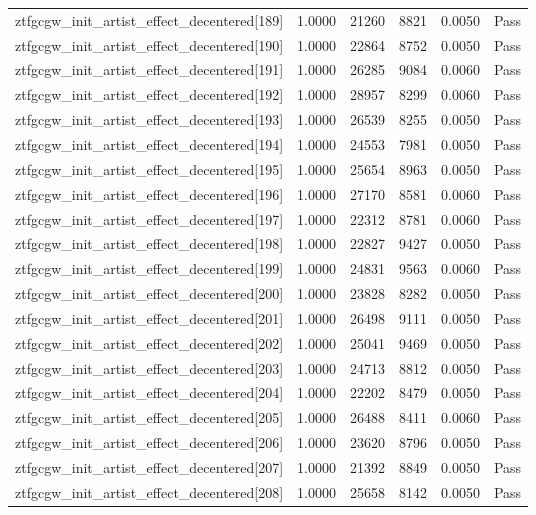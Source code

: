 \begin{table}[htbp]
\begin{tabular}{llrrll}
ztfgcgw\_init\_artist\_effect\_decentered[189] & 1.0000 & 21260 & 8821 & 0.0050 & Pass \\
ztfgcgw\_init\_artist\_effect\_decentered[190] & 1.0000 & 22864 & 8752 & 0.0050 & Pass \\
ztfgcgw\_init\_artist\_effect\_decentered[191] & 1.0000 & 26285 & 9084 & 0.0060 & Pass \\
ztfgcgw\_init\_artist\_effect\_decentered[192] & 1.0000 & 28957 & 8299 & 0.0060 & Pass \\
ztfgcgw\_init\_artist\_effect\_decentered[193] & 1.0000 & 26539 & 8255 & 0.0050 & Pass \\
ztfgcgw\_init\_artist\_effect\_decentered[194] & 1.0000 & 24553 & 7981 & 0.0050 & Pass \\
ztfgcgw\_init\_artist\_effect\_decentered[195] & 1.0000 & 25654 & 8963 & 0.0050 & Pass \\
ztfgcgw\_init\_artist\_effect\_decentered[196] & 1.0000 & 27170 & 8581 & 0.0060 & Pass \\
ztfgcgw\_init\_artist\_effect\_decentered[197] & 1.0000 & 22312 & 8781 & 0.0060 & Pass \\
ztfgcgw\_init\_artist\_effect\_decentered[198] & 1.0000 & 22827 & 9427 & 0.0050 & Pass \\
ztfgcgw\_init\_artist\_effect\_decentered[199] & 1.0000 & 24831 & 9563 & 0.0060 & Pass \\
ztfgcgw\_init\_artist\_effect\_decentered[200] & 1.0000 & 23828 & 8282 & 0.0050 & Pass \\
ztfgcgw\_init\_artist\_effect\_decentered[201] & 1.0000 & 26498 & 9111 & 0.0050 & Pass \\
ztfgcgw\_init\_artist\_effect\_decentered[202] & 1.0000 & 25041 & 9469 & 0.0050 & Pass \\
ztfgcgw\_init\_artist\_effect\_decentered[203] & 1.0000 & 24713 & 8812 & 0.0050 & Pass \\
ztfgcgw\_init\_artist\_effect\_decentered[204] & 1.0000 & 22202 & 8479 & 0.0050 & Pass \\
ztfgcgw\_init\_artist\_effect\_decentered[205] & 1.0000 & 26488 & 8411 & 0.0060 & Pass \\
ztfgcgw\_init\_artist\_effect\_decentered[206] & 1.0000 & 23620 & 8796 & 0.0050 & Pass \\
ztfgcgw\_init\_artist\_effect\_decentered[207] & 1.0000 & 21392 & 8849 & 0.0050 & Pass \\
ztfgcgw\_init\_artist\_effect\_decentered[208] & 1.0000 & 25658 & 8142 & 0.0050 & Pass \\

\end{tabular}
\end{table}
